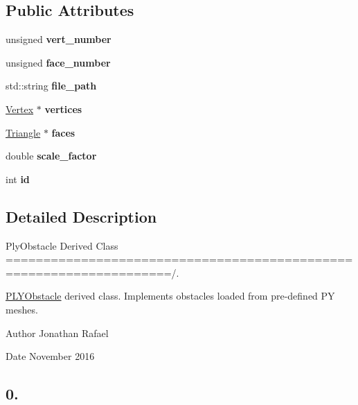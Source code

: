 \subsection*{Public Attributes}
\begin{DoxyCompactItemize}
\item 
\mbox{\label{class_p_l_y_obstacle_a5e14e62690601a6273147aca53751569}} 
unsigned {\bfseries vert\+\_\+number}
\item 
\mbox{\label{class_p_l_y_obstacle_a9664285e5921c10b8d05954849f23e8d}} 
unsigned {\bfseries face\+\_\+number}
\item 
\mbox{\label{class_p_l_y_obstacle_ab384ad44fb6165d7d7277157e774ba40}} 
std\+::string {\bfseries file\+\_\+path}
\item 
\mbox{\label{class_p_l_y_obstacle_a59d10b1c902e053caaf905e81bb618a6}} 
\hyperlink{class_vertex}{Vertex} $\ast$ {\bfseries vertices}
\item 
\mbox{\label{class_p_l_y_obstacle_acd5752df4a98fbe92382184d732ddbc9}} 
\hyperlink{class_triangle}{Triangle} $\ast$ {\bfseries faces}
\item 
\mbox{\label{class_p_l_y_obstacle_a3ddffa50af76259975a4b8d13c1019da}} 
double {\bfseries scale\+\_\+factor}
\item 
\mbox{\label{class_p_l_y_obstacle_acf5a992f0da5e81dddf32484e24956ac}} 
int {\bfseries id}
\end{DoxyCompactItemize}


\subsection{Detailed Description}
Ply\+Obstacle Derived Class ====================================================================/. 

\hyperlink{class_p_l_y_obstacle}{P\+L\+Y\+Obstacle} derived class. Implements obstacles loaded from pre-\/defined PY meshes. \begin{DoxyAuthor}{Author}
Jonathan Rafael 
\end{DoxyAuthor}
\begin{DoxyDate}{Date}
November 2016 \subsection*{0. }
\end{DoxyDate}


